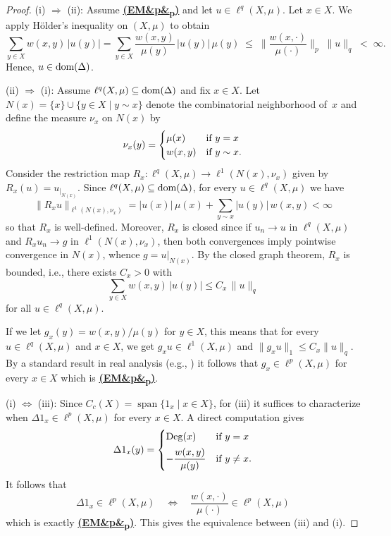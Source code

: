 \documentclass[letterpaper]{article}
\theoremstyle{definition}
\theoremstyle{named}
\numberwithin{equation}{section}
\newcommand{\EM}[1][]{\hyperlink{ass:EM}{\textup{\textbf{(EM\ifx&#1&\else\textsubscript{#1}\fi)}}}}
\newcommand{\dom}{\textnormal{dom}} %
\newcommand{\Deg}{\operatorname{Deg}}
\begin{document}
\begin{proof}
(i) $\Longrightarrow$ (ii):
Assume \EM[p] and let $u\in\ell^{q}(X,\mu)$. Let $x \in X$.
We apply H\"older's inequality on $(X,\mu)$ to obtain
\[
  \sum_{y\in X}w(x,y)\,|u(y)| = \sum_{y\in X}\frac{w(x,y)}{\mu(y)}\,|u(y)|\,\mu(y)
  \;\le\;
  \biggl\|\frac{w(x,\cdot)}{\mu(\cdot)}\biggr\|_p
  \;\|u\|_q
  \;<\;\infty.
\]
Hence, $u\in\dom(\Delta)$.

(ii) $\Longrightarrow$ (i):
Assume $\ell^{q}(X,\mu)\subseteq\dom(\Delta)$ and fix $x\in X$.
Let $N(x)=\{x\}\cup\{y\in X \mid y\sim x\}$ denote the combinatorial
neighborhood of~$x$ and define the measure $\nu_x$ on $N(x)$ by
\[
  \nu_x(y)=
  \begin{cases}
    \mu(x) & \textup{if } y=x\\
    w(x,y) & \textup{if } y\sim x.
  \end{cases}
\]
Consider the restriction map $R_x\colon\ell^{q}(X,\mu)\to\ell^{1}(N(x),\nu_x)$
given by $R_x(u)=u_{|_{N(x)}}$.
Since $\ell^{q}(X,\mu)\subseteq\dom(\Delta)$, for every
$u\in\ell^{q}(X,\mu)$ we have
\[
  \|R_x u\|_{\ell^{1}(N(x),\nu_x)}
  =|u(x)|\,\mu(x)+\sum_{y\sim x}|u(y)|\,w(x,y)<\infty
\]
so that $R_x$ is well-defined.
Moreover, $R_x$ is closed since if $u_n\to u$ in $\ell^{q}(X,\mu)$ and
$R_x u_n\to g$ in $\ell^{1}(N(x),\nu_x)$, then both convergences
imply pointwise convergence in $N(x)$, whence $g=u|_{N(x)}$.
By the closed graph theorem, $R_x$ is bounded, i.e., there exists
$C_x>0$ with
\[
  \sum_{y\in X}w(x,y)\,|u(y)|\le C_x\,\|u\|_q
\]
for all $u\in\ell^{q}(X,\mu)$.

If we let $g_x(y)=w(x,y)/\mu(y)$ for $y \in X$, 
this means that for  every $u\in \ell^q(X,\mu)$ and $x \in X$, we get
$g_x u\in \ell^1(X,\mu)$ and  $\|g_xu\|_1\leq C_x \|u\|_q$.
By a standard result in real analysis (e.g., \cite[Theorem 6.14]{Folland1999RealAnalysis}) it follows that $g_x\in \ell^p(X,\mu)$ for every $x \in X$ which is \EM[p].  

(i) $\Longleftrightarrow$ (iii):
Since $C_c(X)=\operatorname{span}\{1_x \mid x\in X\}$, for (iii) it suffices
to characterize when $\Delta 1_x\in\ell^{p}(X,\mu)$ for every $x\in X$.
A direct computation gives
\[
  \Delta 1_x(y)=
  \begin{cases}
    \Deg(x) & \textup{if } y=x\\[4pt]
    \displaystyle-\frac{w(x,y)}{\mu(y)} & \textup{if } y\neq x.
  \end{cases}
\]
It follows that 
\[
  \Delta1_x\in\ell^{p}(X,\mu)
  \quad\Longleftrightarrow\quad
    \frac{w(x,\cdot)}{\mu(\cdot)}\in \ell^p(X,\mu)
\]
which is exactly \EM[p]. This gives the equivalence between (iii) and (i).


\end{proof}
\end{document}
